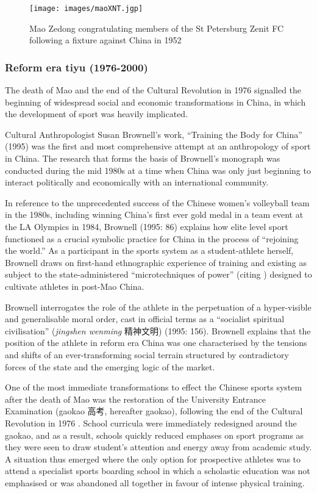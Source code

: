 \begin{figure}[htbp]
  \texttt{[image: images/maoXNT.jgp]}
  \caption{Mao Zedong congratulating members of the St Petersburg Zenit FC following a fixture against China in 1952}
  \label{fig:maoXNT}
\end{figure}


\subsubsection{Reform era tiyu (1976-2000)}
The death of Mao and the end of the Cultural Revolution in 1976 signalled the beginning of widespread social and economic transformations in China, in which the development of sport was heavily implicated.

Cultural Anthropologist Susan Brownell’s work, ``Training the Body for China'' (1995) was the first and most comprehensive attempt at an anthropology of sport in China. The research that forms the basis of Brownell's monograph was conducted during the mid 1980s at a time when China was only just beginning to interact politically and economically with an international community.


 In reference to the unprecedented success of the Chinese women’s volleyball team in the 1980s, including winning China's first ever gold medal in a team event at the LA Olympics in 1984, Brownell (1995: 86) explains how elite level sport functioned as a crucial symbolic practice for China in the process of ``rejoining the world.''  As a participant in the sports system as a student-athlete herself, Brownell draws on first-hand ethnographic experience of training and existing as subject to the state-administered ``microtechniques of power'' (citing \cite{Foucault1977}) designed to cultivate athletes in post-Mao China.


Brownell interrogates the role of the athlete in the perpetuation of a hyper-visible and generalisable moral order, cast in official terms as a ``socialist spiritual civilisation'' (\textit{jingshen wenming} 精神文明) (1995: 156).  Brownell explains that the position of the athlete in reform era China was one characterised by the tensions and shifts of an ever-transforming social terrain structured by contradictory forces of the state and the emerging logic of the market.

One of the most immediate transformations to effect the Chinese sports system after the death of Mao was the restoration of the University Entrance Examination (gaokao 高考, hereafter gaokao), following the end of the Cultural Revolution in 1976 \citep[198]{Brownell1995}.  School curricula were immediately redesigned around the gaokao, and as a result, schools quickly reduced emphases on sport programs as they were seen to draw student’s attention and energy away from academic study.  A situation thus emerged where the only option for prospective athletes was to attend a specialist sports boarding school in which a scholastic education was not emphasised or was abandoned all together in favour of intense physical training.

